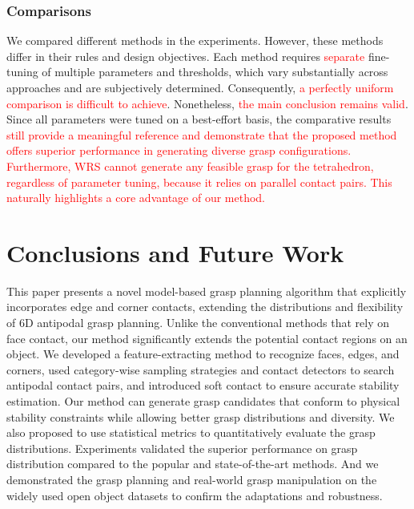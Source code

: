 \documentclass[journal]{IEEEtran}
\newcommand{\rev}[1]{\textcolor{red}{#1}}
\begin{document}
\subsubsection{Comparisons}
We compared different methods in the experiments. However, these methods differ in their rules and design objectives. Each method requires \rev{separate} fine-tuning of multiple parameters and thresholds, which vary substantially across approaches and are subjectively determined. Consequently, \rev{a perfectly uniform comparison is difficult to achieve}. Nonetheless, \rev{the main conclusion remains valid}. Since all parameters were tuned on a best-effort basis, the comparative results \rev{still provide a meaningful reference and demonstrate that the proposed method offers superior performance in generating diverse grasp configurations. Furthermore, WRS cannot generate any feasible grasp for the tetrahedron, regardless of parameter tuning, because it relies on parallel contact pairs. This naturally highlights a core advantage of our method.}
\section{Conclusions and Future Work}
\label{sec:conclusion}
This paper presents a novel model-based grasp planning algorithm that explicitly incorporates edge and corner contacts, extending the distributions and flexibility of 6D antipodal grasp planning. Unlike the conventional methods that rely on face contact, our method significantly extends the potential contact regions on an object. We developed a feature-extracting method to recognize faces, edges, and corners, used category-wise sampling strategies and contact detectors to search antipodal contact pairs, and introduced soft contact to ensure accurate stability estimation. Our method can generate grasp candidates that conform to physical stability constraints while allowing better grasp distributions and diversity. We also proposed to use statistical metrics to quantitatively evaluate the grasp distributions.
Experiments validated the superior performance on grasp distribution compared to the popular and state-of-the-art methods. And we demonstrated the grasp planning and real-world grasp manipulation on the widely used open object datasets to confirm the adaptations and robustness. 
\end{document}
